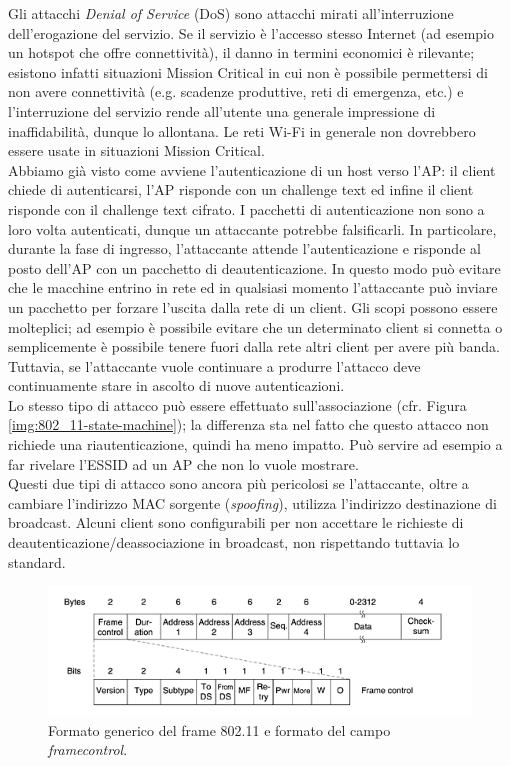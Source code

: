 Gli attacchi \textit{Denial of Service} (DoS) sono attacchi mirati all'interruzione dell'erogazione del servizio. Se il servizio è l'accesso stesso Internet (ad esempio un hotspot che offre connettività), il danno in termini economici è rilevante; esistono infatti situazioni Mission Critical in cui non è possibile permettersi di non avere connettività (e.g. scadenze produttive, reti di emergenza, etc.) e l'interruzione del servizio rende all'utente una generale impressione di inaffidabilità, dunque lo allontana. Le reti Wi-Fi in generale non dovrebbero essere usate in situazioni Mission Critical.\\
Abbiamo già visto come avviene l'autenticazione di un host verso l'AP: il client chiede di autenticarsi, l'AP risponde con un challenge text ed infine il client risponde con il challenge text cifrato. I pacchetti di autenticazione non sono a loro volta autenticati, dunque un attaccante potrebbe falsificarli. In particolare, durante la fase di ingresso, l'attaccante attende l'autenticazione e risponde al posto dell'AP con un pacchetto di deautenticazione. In questo modo può evitare che le macchine entrino in rete ed in qualsiasi momento l'attaccante può inviare un pacchetto per forzare l'uscita dalla rete di un client. Gli scopi possono essere molteplici; ad esempio è possibile evitare che un determinato client si connetta o semplicemente è possibile tenere fuori dalla rete altri client per avere più banda. Tuttavia, se l'attaccante vuole continuare a produrre l'attacco deve continuamente stare in ascolto di nuove autenticazioni.\\
Lo stesso tipo di attacco può essere effettuato sull'associazione (cfr. Figura \ref{img:802_11-state-machine}); la differenza sta nel fatto che questo attacco non richiede una riautenticazione, quindi ha meno impatto. Può servire ad esempio a far rivelare l'ESSID ad un AP che non lo vuole mostrare.\\
Questi due tipi di attacco sono ancora più pericolosi se l'attaccante, oltre a cambiare l'indirizzo MAC sorgente (\textit{spoofing}), utilizza l'indirizzo destinazione di broadcast. Alcuni client sono configurabili per non accettare le richieste di deautenticazione/deassociazione in broadcast, non rispettando tuttavia lo standard.
\begin{figure}[htbp]
	\centering
	\includegraphics[scale = 0.8]{images/802_11-frame}
	\caption{Formato generico del frame 802.11 e formato del campo \textit{framecontrol}.}
	\label{img:802_11-frame}
\end{figure}\\
